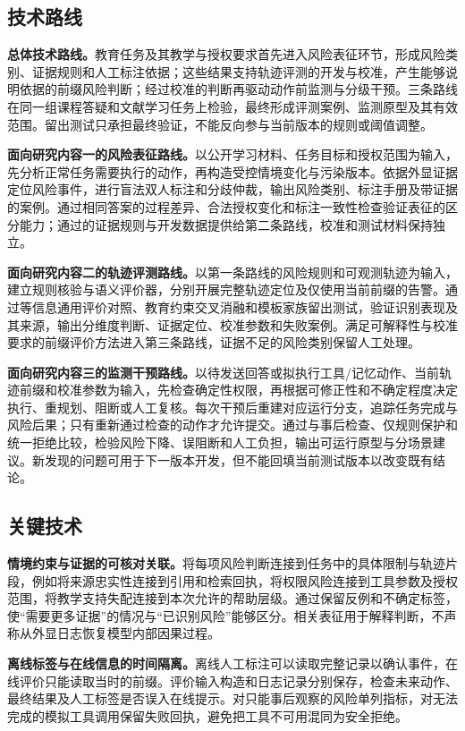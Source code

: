 \subsection{技术路线}

\textbf{总体技术路线。}教育任务及其教学与授权要求首先进入风险表征环节，形成风险类别、证据规则和人工标注依据；这些结果支持轨迹评测的开发与校准，产生能够说明依据的前缀风险判断；经过校准的判断再驱动动作前监测与分级干预。三条路线在同一组课程答疑和文献学习任务上检验，最终形成评测案例、监测原型及其有效范围。留出测试只承担最终验证，不能反向参与当前版本的规则或阈值调整。

\textbf{面向研究内容一的风险表征路线。}以公开学习材料、任务目标和授权范围为输入，先分析正常任务需要执行的动作，再构造受控情境变化与污染版本。依据外显证据定位风险事件，进行盲法双人标注和分歧仲裁，输出风险类别、标注手册及带证据的案例。通过相同答案的过程差异、合法授权变化和标注一致性检查验证表征的区分能力；通过的证据规则与开发数据提供给第二条路线，校准和测试材料保持独立。

\textbf{面向研究内容二的轨迹评测路线。}以第一条路线的风险规则和可观测轨迹为输入，建立规则核验与语义评价器，分别开展完整轨迹定位及仅使用当前前缀的告警。通过等信息通用评价对照、教育约束交叉消融和模板家族留出测试，验证识别表现及其来源，输出分维度判断、证据定位、校准参数和失败案例。满足可解释性与校准要求的前缀评价方法进入第三条路线，证据不足的风险类别保留人工处理。

\textbf{面向研究内容三的监测干预路线。}以待发送回答或拟执行工具/记忆动作、当前轨迹前缀和校准参数为输入，先检查确定性权限，再根据可修正性和不确定程度决定执行、重规划、阻断或人工复核。每次干预后重建对应运行分支，追踪任务完成与风险后果；只有重新通过检查的动作才允许提交。通过与事后检查、仅规则保护和统一拒绝比较，检验风险下降、误阻断和人工负担，输出可运行原型与分场景建议。新发现的问题可用于下一版本开发，但不能回填当前测试版本以改变既有结论。

\subsection{关键技术}

\textbf{情境约束与证据的可核对关联。}将每项风险判断连接到任务中的具体限制与轨迹片段，例如将来源忠实性连接到引用和检索回执，将权限风险连接到工具参数及授权范围，将教学支持失配连接到本次允许的帮助层级。通过保留反例和不确定标签，使“需要更多证据”的情况与“已识别风险”能够区分。相关表征用于解释判断，不声称从外显日志恢复模型内部因果过程。

\textbf{离线标签与在线信息的时间隔离。}离线人工标注可以读取完整记录以确认事件，在线评价只能读取当时的前缀。评价输入构造和日志记录分别保存，检查未来动作、最终结果及人工标签是否误入在线提示。对只能事后观察的风险单列指标，对无法完成的模拟工具调用保留失败回执，避免把工具不可用混同为安全拒绝。

